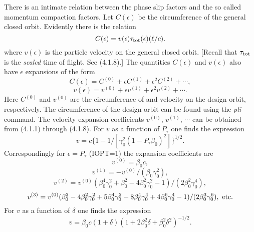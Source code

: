 There is an intimate relation between the phase slip factors and the so called momentum compaction factors.  Let $C(\epsilon )$ be the circumference of the general closed orbit.  
Evidently there is the relation
\begin{equation}
C(\epsilon ) = v(\epsilon ) \tau_{\rm tot} (\epsilon ) (\ell /c).
\end{equation}
where $v (\epsilon )$ is the particle velocity on the general closed
orbit.  [Recall that $\tau_{\rm tot}$ is the {\em scaled} time of flight.  See
(4.1.8).]  The quantities $C(\epsilon )$ and $v(\epsilon )$ also have
$\epsilon$ expansions of the form
\begin{equation}
C(\epsilon ) = C^{(0)} + \epsilon C^{(1)} + \epsilon^2C^{(2)} + \cdots ,
\end{equation}
\begin{equation}
v(\epsilon ) = v^{(0)} + \epsilon v^{(1)} + \epsilon^2v^{(2)} + \cdots .
\end{equation}
Here $C^{(0)}$ and $v^{(0)}$ are the circumference of and velocity on the
design orbit, respectively.  The circumference of the design orbit can be
found using the {\em pli} command.  The velocity expansion coefficients
$v^{(0)}$, $v^{(1)}$, $\cdots$ can be obtained from (4.1.1) through
(4.1.8).  For $v$ as a function of $P_{\tau}$ one finds the expression  
\begin{equation}
v = c \{ 1 - 1/[\gamma^2_0 (1 - P_{\tau}\beta_0)^2]\}^{1/2}.
\end{equation}
Correspondingly for $\epsilon = P_{\tau}$ (IOPT=1) the expansion
coefficients are
\begin{equation}
v^{(0)} = \beta_0c,
\end{equation}
\begin{equation}
v^{(1)} = -v^{(0)}/(\beta_0 \gamma_0^2),
\end{equation}
\begin{equation}
v^{(2)} = v^{(0)}(\beta_0^4 \gamma^2_0 + \beta^2_0 - 4\beta^2_0 \gamma^2_0
-1)/(2\beta^2_0 \gamma_0^4),
\end{equation}
\begin{equation}
v^{(3)} = v^{(0)}(\beta_0^2 - 4\beta^2_0 \gamma^2_0  + 5\beta^4_0
\gamma^2_0 - 8\beta^4_0 \gamma^4_0 + 4\beta^6_0 \gamma^4_0
-1)/(2\beta^3_0 \gamma_0^6), \ {\rm etc.}
\end{equation}
For $v$ as a function of $\delta$ one finds the expression
\begin{equation}
v = \beta_0 c(1 + \delta )(1 + 2 \beta^2_0\delta +
\beta^2_0\delta^2)^{-1/2}.
\end{equation}
